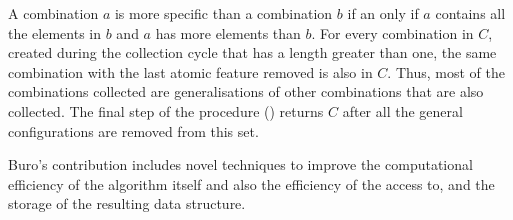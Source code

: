 A combination $a$ is more specific than a combination $b$ if an only if $a$ contains all the elements in $b$ and $a$ has more elements than $b$.  For every combination in $C$, created during the collection cycle that has a length greater than one, the same combination with the last atomic feature removed is also in $C$.  Thus, most of the combinations collected are generalisations of other combinations that are also collected.  The final step of the procedure () returns $C$ after all the general configurations are removed from this set.

Buro's contribution \cite{buro:feature} includes novel techniques to improve the computational efficiency of the algorithm itself and also the efficiency of the access to, and the storage of the resulting data structure. 

